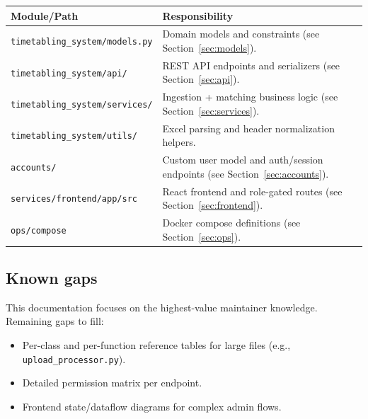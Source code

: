 \begin{longtable}{p{}p{}}
\toprule
\textbf{Module/Path} & \textbf{Responsibility} \\
\midrule
\texttt{timetabling\_system/models.py} & Domain models and constraints (see Section~\ref{sec:models}). \\
\texttt{timetabling\_system/api/} & REST API endpoints and serializers (see Section~\ref{sec:api}). \\
\texttt{timetabling\_system/services/} & Ingestion + matching business logic (see Section~\ref{sec:services}). \\
\texttt{timetabling\_system/utils/} & Excel parsing and header normalization helpers. \\
\texttt{accounts/} & Custom user model and auth/session endpoints (see Section~\ref{sec:accounts}). \\
\texttt{services/frontend/app/src} & React frontend and role-gated routes (see Section~\ref{sec:frontend}). \\
\texttt{ops/compose} & Docker compose definitions (see Section~\ref{sec:ops}). \\
\bottomrule
\end{longtable}

\subsection{Known gaps}
\label{subsec:glossary:gaps}

This documentation focuses on the highest-value maintainer knowledge. Remaining gaps to fill:

\begin{itemize}
  \item Per-class and per-function reference tables for large files (e.g., \texttt{upload\_processor.py}).
  \item Detailed permission matrix per endpoint.
  \item Frontend state/dataflow diagrams for complex admin flows.
\end{itemize}

